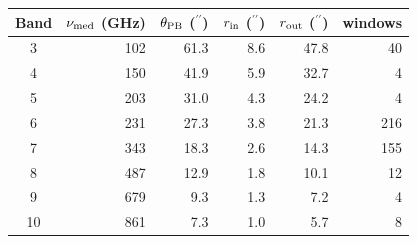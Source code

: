 \begin{tabular}{@{}crrrrr@{}}
\toprule
Band & $\nu_{\rm med}$ (GHz) & $\theta_{\rm PB}$ ($^{\prime\prime}$) & $r_{\rm in}$ ($^{\prime\prime}$) & $r_{\rm out}$ ($^{\prime\prime}$) & windows \\
\midrule
3 & 102 & 61.3 & 8.6 & 47.8 & 40 \\
4 & 150 & 41.9 & 5.9 & 32.7 & 4 \\
5 & 203 & 31.0 & 4.3 & 24.2 & 4 \\
6 & 231 & 27.3 & 3.8 & 21.3 & 216 \\
7 & 343 & 18.3 & 2.6 & 14.3 & 155 \\
8 & 487 & 12.9 & 1.8 & 10.1 & 12 \\
9 & 679 & 9.3 & 1.3 & 7.2 & 4 \\
10 & 861 & 7.3 & 1.0 & 5.7 & 8 \\
\bottomrule
\end{tabular}
